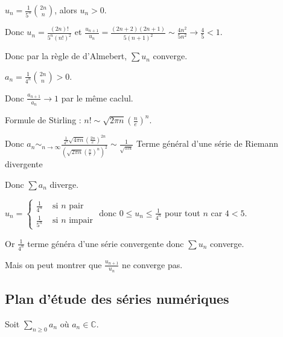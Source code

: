 \begin{exemple}
    $u_n = \frac{1 }{5^n } \binom{2n}{n}$, alors $u_n > 0$. 

    Donc $\displaystyle u_n = \frac{(2n)!}{5^n (n!)^2}$ et $\frac{u_{n + 1}}{u_n} = \frac{(2n + 2)(2n + 1)}{5 (n + 1)^2} \sim \frac{4 n^2}{5 n^2} \longrightarrow \frac 4 5 < 1$.

    Donc par la règle de d'Almebert, $\sum u_n$ converge.

    \lvspace $\displaystyle a_n = \frac{1}{4^n} \binom{2n}{n} > 0$. 

    Donc $\frac{a_{n + 1}}{a_n} \longrightarrow 1$ par le même caclul. 

    Formule de Stirling : $n! \sim \sqrt{2 \pi n} \left( \frac{n}{e} \right)^n$.

    \svspace Donc $\displaystyle a_n \sim_{n \to \infty} \frac{\frac{1}{4^n} \sqrt{4 \pi n} \left( \frac{2n} e \right)^{2n}}{\left( \sqrt{2 \pi n} \left( \frac{n}{e} \right)^n \right)^2 } \sim \frac 1 {\sqrt{ \pi n}}$
    Terme général d'une série de Riemann divergente 

    Donc $\sum a_n$ diverge.

    \lvspace $u_n = \left\{ \begin{array}{rl}
        \frac{1}{4^n} & \text{ si } n \text{ pair} \\
        \frac{1}{5^n} & \text{ si } n \text{ impair}
    \end{array} \right.$
    donc $0 \leqslant u_n \leqslant \frac 1 {4^n}$ pour tout $n$ car $4 < 5$.

    Or $\frac 1 {4^n}$ terme généra d'une série convergente donc $\sum u_n$ converge. 

    Mais on peut montrer que $\frac{u_{n + 1}}{u_n}$ ne converge pas.
\end{exemple}

\subsection{Plan d'étude des séries numériques }

Soit $\displaystyle \sum_{n \ge 0} a_n$ où $a_n \in \mathbb{C}$.

